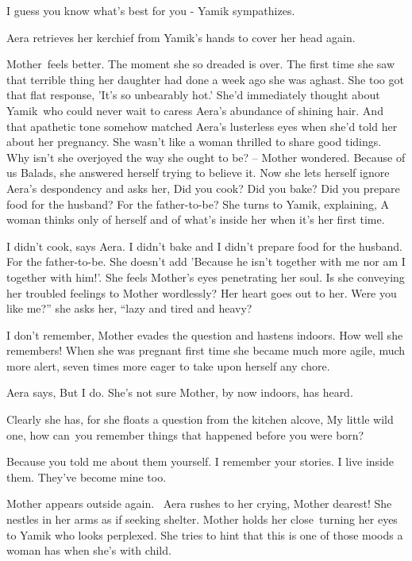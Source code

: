 \documentclass[letterpaper]{article}
\begin{document}
{\textquotedbl}I guess you know what's best for you -{\textquotedbl} Yamik sympathizes. 

Aera retrieves her kerchief from Yamik's hands to cover her head again.

Mother~feels better. The moment she so dreaded is over. The first time she saw that terrible thing her daughter had done
a week ago she was aghast. She too got that flat response, 'It's so unbearably hot.' She'd immediately thought about
Yamik~who could never wait to caress Aera's abundance of shining hair. And that apathetic tone somehow matched Aera's
lusterless eyes when she'd told her about her pregnancy. She wasn't like a woman thrilled to share good tidings. Why
isn't she overjoyed the way she ought to be? -- Mother wondered. Because of us Balads, she answered herself trying to
believe it. Now she lets herself ignore Aera's despondency and asks her, {\textquotedbl}Did you cook? Did you bake? Did
you prepare food for the husband? For the father-to-be?{\textquotedbl} She turns to Yamik, explaining, {\textquotedbl}A
woman thinks only of herself and of what's inside her when it's her first time.{\textquotedbl}

{\textquotedbl}I didn't cook,{\textquotedbl} says Aera. {\textquotedbl}I didn't bake and I didn't prepare food for the
husband. For the father-to-be.{\textquotedbl} She doesn't add 'Because he isn't together with me nor am I together with
him!'. She feels Mother's eyes penetrating her soul. Is she conveying her troubled feelings to Mother wordlessly? Her
heart goes out to her. {\textquotedbl}Were you like me?'' she asks her, ``lazy and tired and heavy?{\textquotedbl} 

{\textquotedbl}I don't remember,{\textquotedbl} Mother evades the question and hastens indoors. How well she remembers!
When she was pregnant first time she became much more agile, much more alert, seven times more eager to take upon
herself any chore.~~~ 

Aera says, {\textquotedbl}But I do.{\textquotedbl} She's not sure Mother, by now indoors, has heard. 

Clearly she has, for she floats a question from the kitchen alcove, {\textquotedbl}My little wild one, how can~you
remember things that happened before you were born?{\textquotedbl} 

{\textquotedbl}Because you told me about them yourself. I remember your stories. I live inside them. They've become mine
too.{\textquotedbl}

Mother appears outside again. ~Aera rushes to her crying, {\textquotedbl}Mother dearest!{\textquotedbl} She nestles in
her arms as if seeking shelter. Mother holds her close~turning her eyes to Yamik who looks perplexed. She tries to hint
that this is one of those moods a woman has when she's with child. 
\end{document}
